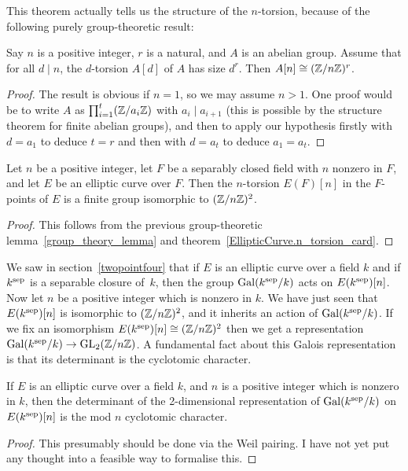 This theorem actually tells us the structure of the $n$-torsion, because of the following
purely group-theoretic result:
\begin{lemma}\label{group_theory_lemma}
  Say $n$ is a positive integer, $r$ is a natural, and $A$ is an abelian group. Assume that for all $d\mid n$, the $d$-torsion $A[d]$ of $A$ has size $d^r$. Then $A[n]\cong (\mathbb{Z}/n\mathbb{Z})^r$. 
\end{lemma}
\begin{proof}
  The result is obvious if $n=1$, so we may assume $n>1$. One proof would be to write $A$ as $\prod_{i=1}^t(\mathbb{Z}/a_i\mathbb{Z})$
  with $a_i\mid a_{i+1}$ (this is possible by the structure theorem for finite abelian groups), and then to apply our hypothesis firstly with $d=a_1$ to deduce $t=r$ and then with $d=a_t$ to deduce $a_1=a_t$.
\end{proof}

\begin{corollary}\label{Elliptic_curve_n_torsion_2d}
  Let $n$ be a positive integer, let $F$ be a separably closed
  field with $n$ nonzero in $F$, and let $E$ be an elliptic curve over $F$. Then the $n$-torsion $E(F)[n]$ 
  in the $F$-points of $E$ is a finite group isomorphic to $(\mathbb{Z}/n\mathbb{Z})^2$.
\end{corollary}
\begin{proof}
  This follows from the previous group-theoretic lemma~\ref{group_theory_lemma} and
  theorem~\ref{EllipticCurve.n_torsion_card}.
\end{proof}

We saw in section~\ref{twopointfour} that if $E$ is an elliptic curve over a field $k$ and if $k^{\operatorname{sep}}$ is a separable closure of~$k$, then the group $\operatorname{Gal}(k^{\operatorname{sep}}/k)$ acts on $E(k^{\operatorname{sep}})[n]$. Now let $n$ be a positive integer which is nonzero in $k$. We have just seen that $E(k^{\operatorname{sep}})[n]$ is isomorphic to $(\mathbb{Z}/n\mathbb{Z})^2$, and it inherits an action of $\operatorname{Gal}(k^{\operatorname{sep}}/k)$. If we fix an isomorphism $E(k^{\operatorname{sep}})[n]\cong(\mathbb{Z}/n\mathbb{Z})^2$ then we get a representation $\operatorname{Gal}(k^{\operatorname{sep}}/k)\to\operatorname{GL}_2(\mathbb{Z}/n\mathbb{Z})$. A fundamental fact about this Galois representation is that its determinant is the cyclotomic character.

\begin{theorem}\label{Elliptic_curve_det_n_torsion} If $E$ is an elliptic curve over a field $k$, and $n$ is a positive integer which is nonzero in $k$, then the determinant of the 2-dimensional representation of $\operatorname{Gal}(k^{\operatorname{sep}}/k)$ on $E(k^{\operatorname{sep}})[n]$ is the mod $n$ cyclotomic character.
\end{theorem}
\begin{proof}
  This presumably should be done via the Weil pairing. I have not yet put any thought into a feasible way to formalise this.
\end{proof}

